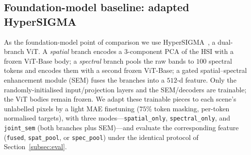 \subsection{Foundation-model baseline: adapted HyperSIGMA}
\label{subsec:hypersigma}
As the foundation-model point of comparison we use HyperSIGMA~\cite{hypersigma}, a
dual-branch ViT. A \emph{spatial} branch encodes a $3$-component PCA of the HSI with
a frozen ViT-Base body; a \emph{spectral} branch pools the raw bands to $100$
spectral tokens and encodes them with a second frozen ViT-Base; a gated
spatial--spectral enhancement module (SEM) fuses the branches into a $512$-d
feature. Only the randomly-initialised input/projection layers and the SEM/decoders
are trainable; the ViT bodies remain frozen. We adapt these trainable pieces to each
scene's unlabelled pixels by a light MAE finetuning ($75\%$ token masking,
per-token normalised targets), with three modes---\texttt{spatial\_only},
\texttt{spectral\_only}, and \texttt{joint\_sem} (both branches plus SEM)---and
evaluate the corresponding feature (\texttt{fused}, \texttt{spat\_pool}, or
\texttt{spec\_pool}) under the identical protocol of
Section~\ref{subsec:eval}.
